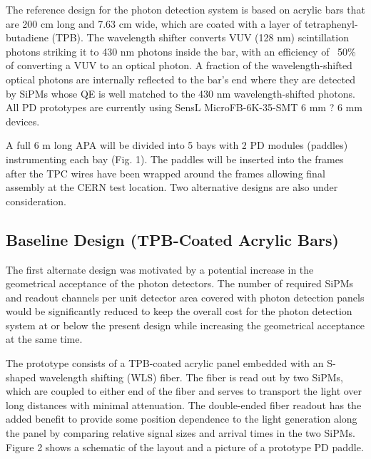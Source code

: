 The reference design for the photon detection system is based on acrylic bars that are 200 cm long and 7.63 cm wide, which are coated with a layer of tetraphenyl-butadiene (TPB). The wavelength shifter converts VUV (128 nm) scintillation photons striking it to 430 nm photons inside the bar, with an efficiency of ~50\% of converting a VUV to an optical photon.  A fraction of the wavelength-shifted optical photons are internally reflected to the bar's end where they are detected by SiPMs whose QE is well matched to the 430 nm wavelength-shifted photons. All PD prototypes are currently using SensL MicroFB-6K-35-SMT 6 mm ? 6 mm devices. 

A full 6 m long APA will be divided into 5 bays with 2 PD modules (paddles) instrumenting each bay (Fig.  1). The paddles will be inserted into the frames after the TPC wires have been wrapped around the frames allowing  final assembly at the CERN test location. Two alternative designs are also under consideration. 

\subsection{Baseline Design (TPB-Coated Acrylic Bars)}

The first alternate design was motivated by a potential increase in the geometrical acceptance of the photon detectors. The number of required SiPMs and readout channels per unit detector area covered with photon detection panels would be significantly reduced to keep the overall cost for the photon detection system at or below the present design while increasing the geometrical acceptance at the same time.

The prototype consists of a TPB-coated acrylic panel embedded with an S-shaped wavelength shifting (WLS) fiber. The fiber is read out by two SiPMs, which are coupled to either end of the fiber and serves to transport the light over long distances with minimal attenuation. The double-ended fiber readout has the added benefit to provide some position dependence to the light generation along the panel by comparing relative signal sizes and arrival times in the two SiPMs. Figure 2 shows a schematic of the layout and a picture of a prototype PD paddle.

